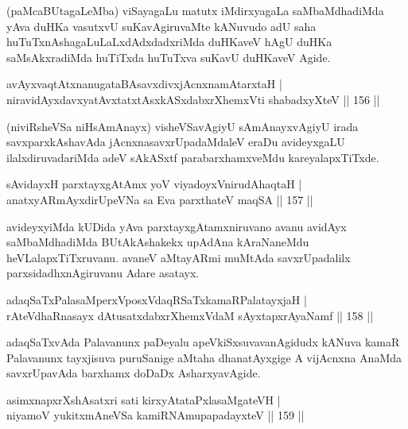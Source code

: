 \begin{artha}
(paMcaBUtagaLeMba) viSayagaLu matutx iMdirxyagaLa saMbaMdhadiMda yAva duHKa vasutxvU suKavAgiruvaMte kANuvudo adU saha huTuTxnAshagaLuLaLxdAdxdadxriMda duHKaveV hAgU duHKa saMsAkxradiMda huTiTxda huTuTxva suKavU duHKaveV Agide.
\end{artha}

\begin{shl}
avAyxvaqtAtxnanugataBAsavxdivxjAcnxnamAtarxtaH |\\
niravidAyxdavxyatAvxtatxtAsxkASxdabxrXhemxVti shabadxyXteV \hfill || 156 ||
\end{shl}

\begin{artha}%
(niviRsheVSa niHsAmAnayx) visheVSavAgiyU sAmAnayxvAgiyU irada savxparxkAshavAda jAcnxnasavxrUpadaMdaleV eraDu avideyxgaLU ilalxdiruvadariMda adeV sAkASxtf parabarxhamxveMdu kareyalapxTiTxde.
\end{artha}

\begin{shl}
sAvidayxH parxtayxgAtAmx yoV viyadoyxVnirudAhaqtaH |\\
anatxyARmAyxdirUpeVNa sa Eva parxthateV maqSA \hfill || 157 ||
\end{shl}

\begin{artha}
avideyxyiMda kUDida yAva parxtayxgAtamxniruvano avanu avidAyx saMbaMdhadiMda BUtAkAshakekx upAdAna kAraNaneMdu heVLalapxTiTxruvanu. avaneV aMtayARmi muMtAda savxrUpadalilx parxsidadhxnAgiruvanu Adare asatayx.
\end{artha}

\begin{shl}
adaqSaTxPalasaMperxVposxVdaqRSaTxkamaRPalatayxjaH |\\
\footnotemark[1]{}rAteVdhaRnasayx dAtusatxdabxrXhemxVdaM sAyxtapxrAyaNamf \hfill || 158 ||
\end{shl}

\begin{artha}
adaqSaTxvAda Palavanunx paDeyalu apeVkiSxsuvavanAgidudx kANuva kamaR Palavanunx tayxjisuva puruSanige aMtaha dhanatAyxgige A vijAcnxna AnaMda savxrUpavAda barxhamx doDaDx AsharxyavAgide.
\end{artha}

\begin{shl}
asimxnapxrXshAsatxri sati kirxyAtataPxlasaMgateVH |\\
niyamoV yukitxmAneVSa kamiRNAmupapadayxteV \hfill || 159 ||
\end{shl}


